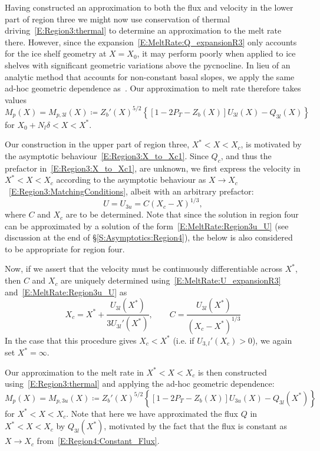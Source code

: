 \documentclass{jfm}
\newcommand{\lt}{\delta} %
\newcommand{\Pt}{\textit{P}_T}
\begin{document}
Having constructed an approximation to both the flux and velocity in the lower part of region three we might now use conservation of thermal driving~\eqref{E:Region3:thermal} to determine an approximation to the melt rate there. However, since the expansion~\eqref{E:MeltRate:Q_expansionR3} only accounts for the ice shelf geometry at $X = X_0$, it may perform poorly when applied to ice shelves with significant geometric variations above the pycnocline. In lieu of an analytic method that accounts for non-constant basal slopes, we apply the same ad-hoc geometric dependence as~\citet{Lazeroms2018TheCryo}. Our approximation to melt rate therefore takes values
\begin{equation}\label{E:MeltRate:regions3_l}
M_{p}(X) = M_{p,3l}(X)\coloneqq Z_b'(X)^{5/2}\left\{\left[1  - 2\Pt -  Z_b(X)\right] U_{3l}(X) - Q_{3l}(X)\right\}
\end{equation}
for $X_0 + N_l \lt < X < X^*$.

Our construction in the upper part of region three, $X^* < X < X_c$, is motivated by the asymptotic behaviour~\eqref{E:Region3:X_to_Xc1}. Since $Q_c$, and thus the prefactor in~\eqref{E:Region3:X_to_Xc1}, are unknown, we first express the velocity in $X^* < X < X_c$ according to the asymptotic behaviour as $X\to X_c$~\eqref{E:Region3:MatchingConditions}, albeit with an arbitrary prefactor:
\begin{equation}\label{E:MeltRate:Region3u_U}
U =U_{3u} =  C (X_c - X)^{1/3},
\end{equation} 
where $C$ and $X_c$ are to be determined. Note that since the solution in region four can be approximated by a solution of the form~\eqref{E:MeltRate:Region3u_U} (see discussion at the end of \S\ref{S:Asymptotics:Region4}), the below is also considered to be appropriate for region four.

Now, if we assert that the velocity must be continuously differentiable across $X^*$, then $C$ and $X_c$ are uniquely determined using~\eqref{E:MeltRate:U_expansionR3} and~\eqref{E:MeltRate:Region3u_U} as
\begin{equation}\label{E:MeltRate:Xc_expression}
X_c = X^* + \frac{U_{3l}(X^*)}{3 U_{3l}'(X^*)}, \qquad C = \frac{U_{3l}(X^*)}{\left(X_c - X^*\right)^{1/3}}
\end{equation}
In the case that this procedure gives $X_c < X^*$ (i.e. if $U_{3,l}'(X_c) > 0$), we again set $X^* = \infty$.

Our approximation to the melt rate in $X^* < X <X_c$ is then constructed using~\eqref{E:Region3:thermal} and applying the ad-hoc geometric dependence:
\begin{equation}\label{E:MeltRate:regions3_u}
M_p(X) = M_{p,3u}(X) \coloneqq Z_b'(X)^{5/2}\left\{ \left[1  - 2\Pt -  Z_b(X)\right] U_{3u}(X) - Q_{3l}(X^*) \right\}
\end{equation}
for $X^* < X < X_c$. Note that here we have approximated the flux $Q$ in $X^* < X < X_c$ by $Q_{3l}(X^*)$, motivated by the fact that the flux is constant as $X \to X_c$ from~\eqref{E:Region4:Constant_Flux}.
\end{document}
